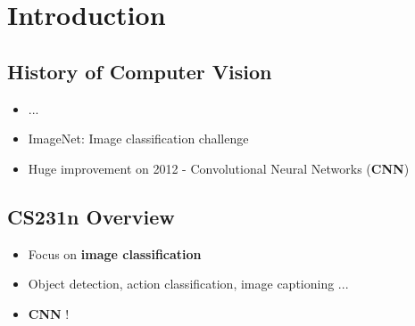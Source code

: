 \section{Introduction}
\subsection{History of Computer Vision}
\begin{itemize}
	\item ...
	\item ImageNet: Image classification challenge
	\item Huge improvement on 2012 - Convolutional Neural Networks (\textbf{CNN})
\end{itemize}

\subsection{CS231n Overview}
\begin{itemize}
	\item Focus on \textbf{image classification}
	\item Object detection, action classification, image captioning ...
	\item \textbf{CNN} !
\end{itemize}